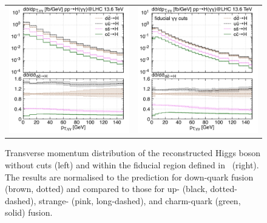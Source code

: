 \documentclass[11pt,a4paper]{article}
\begin{document}
\begin{figure}[h!]
\begin{center}
\begin{tabular}{cc}
\includegraphics[width=.45\textwidth, page=1]{plots/5fs/light/ptH.pdf}&
\includegraphics[width=.45\textwidth, page=1]{plots/5fs/light/pt_Higgs-aafid.pdf}
\end{tabular}
\vspace*{1ex}
\caption{Transverse momentum distribution of the reconstructed Higgs boson without cuts (left) and within the fiducial region defined in~ (right).
The results are normalised to the prediction for down-quark fusion (brown, dotted) and compared to those for up- (black, dotted-dashed), strange- (pink, long-dashed), and charm-quark (green, solid) fusion.
\label{fig:lightpTH}}
\end{center}
\end{figure}
\end{document}
